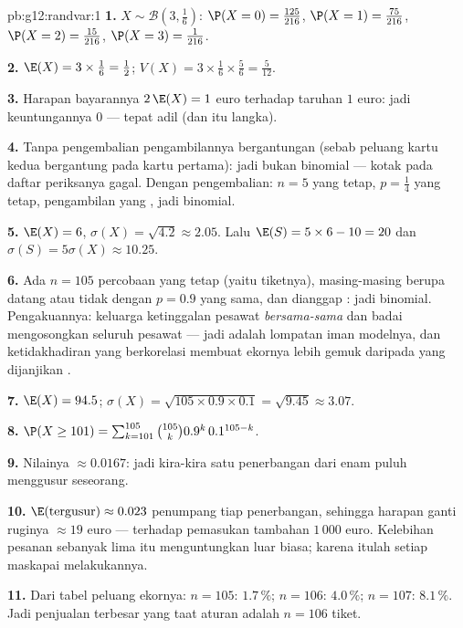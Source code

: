 \begin{solution}{pb:g12:randvar:1}
\textbf{1.} $X \sim \mathcal B\!\left(3, \frac16\right)$:
$\P(X = 0) = \frac{125}{216}$,
$\P(X = 1) = \frac{75}{216}$,
$\P(X = 2) = \frac{15}{216}$,
$\P(X = 3) = \frac{1}{216}$.

\textbf{2.} $\E(X) = 3 \times \frac16 = \frac12$;
$V(X) = 3 \times \frac16 \times \frac56 = \frac{5}{12}$.

\textbf{3.} Harapan bayarannya $2\,\E(X) = 1$ euro terhadap taruhan
$1$ euro: jadi keuntungannya $0$ --- tepat adil (dan itu langka).

\textbf{4.} Tanpa pengembalian pengambilannya bergantungan (sebab
peluang kartu kedua bergantung pada kartu pertama): jadi bukan binomial ---
kotak  pada daftar periksanya gagal. Dengan pengembalian:
$n = 5$ yang tetap, $p = \frac14$ yang tetap, pengambilan yang , jadi
binomial.

\textbf{5.} $\E(X) = 6$, $\sigma(X) = \sqrt{4.2} \approx
2.05$. Lalu $\E(S) = 5 \times 6 - 10 = 20$ dan
$\sigma(S) = 5\sigma(X) \approx 10.25$.

\textbf{6.} Ada $n = 105$ percobaan yang tetap (yaitu tiketnya), masing-masing berupa
datang atau tidak dengan $p = 0.9$ yang sama, dan dianggap : jadi
binomial. Pengakuannya: keluarga ketinggalan pesawat
\emph{bersama-sama} dan badai mengosongkan seluruh pesawat --- jadi 
adalah lompatan iman modelnya, dan ketidakhadiran yang berkorelasi membuat
ekornya lebih gemuk daripada yang dijanjikan .

\textbf{7.} $\E(X) = 94.5$;
$\sigma(X) = \sqrt{105 \times 0.9 \times 0.1} =
\sqrt{9.45} \approx 3.07$.

\textbf{8.} $\P(X \geq 101) = \sum_{k=101}^{105}
\binom{105}{k} 0.9^k\, 0.1^{105 - k}$.

\textbf{9.} Nilainya $\approx 0.0167$: jadi kira-kira satu penerbangan dari enam puluh
menggusur seseorang.

\textbf{10.} $\E(\text{tergusur}) \approx 0.023$ penumpang tiap
penerbangan, sehingga harapan ganti ruginya $\approx 19$ euro --- terhadap
pemasukan tambahan $1\,000$ euro. Kelebihan pesanan sebanyak lima itu
menguntungkan luar biasa; karena itulah setiap maskapai melakukannya.

\textbf{11.} Dari tabel peluang ekornya:
$n = 105$: $1.7\,\%$; $n = 106$: $4.0\,\%$; $n = 107$:
$8.1\,\%$. Jadi penjualan terbesar yang taat aturan adalah $n = 106$ tiket.


\end{solution}
